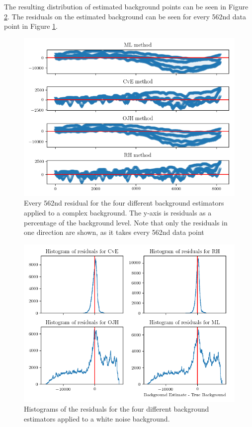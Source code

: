 \documentclass[10pt, a4paper]{article}
\begin{document}
The resulting distribution of estimated background points can be seen in Figure \ref{fig:histogram_complex}. The residuals on the estimated background can be seen for every 562nd data point in Figure \ref{fig:residual_complex}.

\begin{figure}[h!]
\centering
\includegraphics[width=0.49\textheight]{residual_complex}
\caption{Every 562nd residual for the four different background estimators applied to a complex background. The y-axis is residuals as a percentage of the background level. Note that only the residuals in one direction are shown, as it takes every 562nd data point}
\label{fig:residual_complex}
\end{figure}

\begin{figure}[h!]
\centering
\includegraphics[width=0.49\textheight]{histogram_complex}
\caption{Histograms of the residuals for the four different background estimators applied to a white noise background.}
\label{fig:histogram_complex}
\end{figure}
\end{document}

